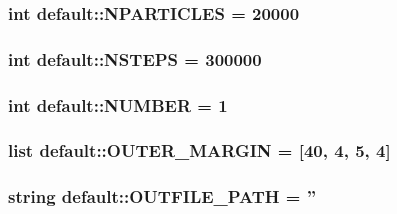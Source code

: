 \hypertarget{namespacedefault_a86f89a12973ba89585f8d3bf80e39bb}{
\subsubsection[{NPARTICLES}]{\setlength{\rightskip}{0pt plus 5cm}int {\bf default::NPARTICLES} = 20000}}
\label{namespacedefault_a86f89a12973ba89585f8d3bf80e39bb}


\hypertarget{namespacedefault_d8fe4498e40472b3484b47a9b8f9b4f4}{
\subsubsection[{NSTEPS}]{\setlength{\rightskip}{0pt plus 5cm}int {\bf default::NSTEPS} = 300000}}
\label{namespacedefault_d8fe4498e40472b3484b47a9b8f9b4f4}


\hypertarget{namespacedefault_afe0a3920f5df428cdac98ff509ecb64}{
\subsubsection[{NUMBER}]{\setlength{\rightskip}{0pt plus 5cm}int {\bf default::NUMBER} = 1}}
\label{namespacedefault_afe0a3920f5df428cdac98ff509ecb64}


\hypertarget{namespacedefault_d933462cfca0c3f8181f44fc9f57060d}{
\subsubsection[{OUTER\_\-MARGIN}]{\setlength{\rightskip}{0pt plus 5cm}list {\bf default::OUTER\_\-MARGIN} = \mbox{[}40, 4, 5, 4\mbox{]}}}
\label{namespacedefault_d933462cfca0c3f8181f44fc9f57060d}


\hypertarget{namespacedefault_67f5df46d57b595458bd2b48834fa686}{
\subsubsection[{OUTFILE\_\-PATH}]{\setlength{\rightskip}{0pt plus 5cm}string {\bf default::OUTFILE\_\-PATH} = ''}}
\label{namespacedefault_67f5df46d57b595458bd2b48834fa686}


